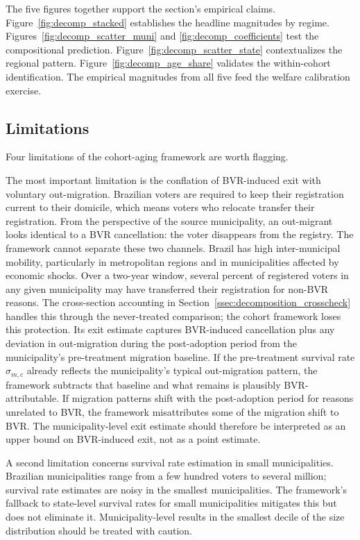 The five figures together support the section's empirical claims. Figure~\ref{fig:decomp_stacked} establishes the headline magnitudes by regime. Figures~\ref{fig:decomp_scatter_muni} and \ref{fig:decomp_coefficients} test the compositional prediction. Figure~\ref{fig:decomp_scatter_state} contextualizes the regional pattern. Figure~\ref{fig:decomp_age_share} validates the within-cohort identification. The empirical magnitudes from all five feed the welfare calibration exercise.

\subsection{Limitations}
\label{ssec:decomposition_limitations}

Four limitations of the cohort-aging framework are worth flagging.

The most important limitation is the conflation of BVR-induced exit with voluntary out-migration. Brazilian voters are required to keep their registration current to their domicile, which means voters who relocate transfer their registration. From the perspective of the source municipality, an out-migrant looks identical to a BVR cancellation: the voter disappears from the registry. The framework cannot separate these two channels. Brazil has high inter-municipal mobility, particularly in metropolitan regions and in municipalities affected by economic shocks. Over a two-year window, several percent of registered voters in any given municipality may have transferred their registration for non-BVR reasons. The cross-section accounting in Section~\ref{ssec:decomposition_crosscheck} handles this through the never-treated comparison; the cohort framework loses this protection. Its exit estimate captures BVR-induced cancellation plus any deviation in out-migration during the post-adoption period from the municipality's pre-treatment migration baseline. If the pre-treatment survival rate $\hat\sigma_{m,c}$ already reflects the municipality's typical out-migration pattern, the framework subtracts that baseline and what remains is plausibly BVR-attributable. If migration patterns shift with the post-adoption period for reasons unrelated to BVR, the framework misattributes some of the migration shift to BVR. The municipality-level exit estimate should therefore be interpreted as an upper bound on BVR-induced exit, not as a point estimate.

A second limitation concerns survival rate estimation in small municipalities. Brazilian municipalities range from a few hundred voters to several million; survival rate estimates are noisy in the smallest municipalities. The framework's fallback to state-level survival rates for small municipalities mitigates this but does not eliminate it. Municipality-level results in the smallest decile of the size distribution should be treated with caution.

